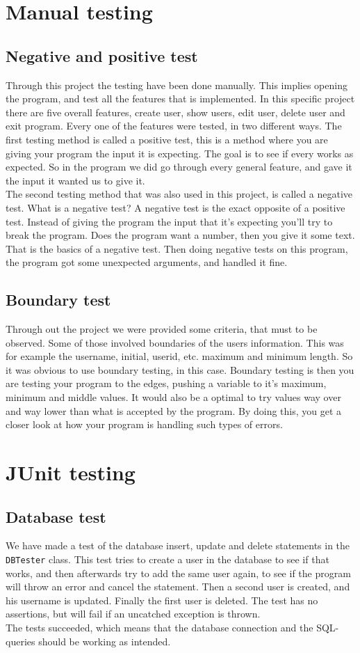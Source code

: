 \section{Manual testing}
\subsection{Negative and positive test}
Through this project the testing have been done manually. This implies opening the program, and test all the features that is implemented. In this specific project there are five overall features, create user, show users, edit user, delete user and exit program. Every one of the features were tested, in two different ways. The first testing method is called a positive test, this is a method where you are giving your program the input it is expecting. The goal is to see if every works as expected. So in the program we did go through every general feature, and gave it the input it wanted us to give it.\\
The second testing method that was also used in this project, is called a negative test. What is a negative test? A negative test is the exact opposite of a positive test. Instead of giving the program the input that it's expecting you'll try to break the program. Does the program want a number, then you give it some text. That is the basics of a negative test. Then doing negative tests on this program, the program got some unexpected arguments, and handled it fine. 
\subsection{Boundary test}
Through out the project we were provided some criteria, that must to be observed. Some of those involved boundaries of the users information. This was for example the username, initial, userid, etc. maximum and minimum length. So it was obvious to use boundary testing, in this case. Boundary testing is then you are testing your program to the edges, pushing a variable to it's maximum, minimum and middle values. It would also be a optimal to try values way over and way lower than what is accepted by the program. By doing this, you get a closer look at how your program is handling such types of errors.

\section{JUnit testing}
\subsection{Database test}
We have made a test of the database insert, update and delete statements in the \texttt{DBTester} class. This test tries to create a user in the database to see if that works, and then afterwards try to add the same user again, to see if the program will throw an error and cancel the statement. Then a second user is created, and his username is updated. Finally the first user is deleted. The test has no assertions, but will fail if an uncatched exception is thrown.\\
The tests succeeded, which means that the database connection and the SQL-queries should be working as intended.